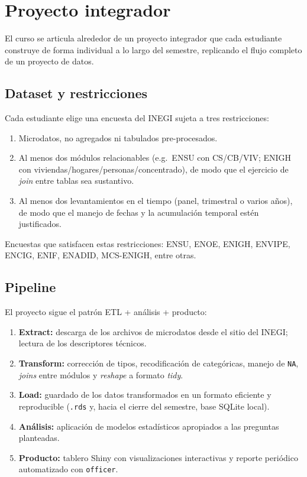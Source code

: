 \documentclass[11pt,letterpaper]{article}
\begin{document}
\section{Proyecto integrador}

El curso se articula alrededor de un proyecto integrador que cada estudiante construye de forma individual a lo largo del semestre, replicando el flujo completo de un proyecto de datos.

\subsection*{Dataset y restricciones}

Cada estudiante elige una encuesta del INEGI sujeta a tres restricciones:

\begin{enumerate}[leftmargin=*, itemsep=1pt]
    \item Microdatos, no agregados ni tabulados pre-procesados.
    \item Al menos dos módulos relacionables (e.g.\ ENSU con CS/CB/VIV; ENIGH con viviendas/hogares/personas/concentrado), de modo que el ejercicio de \textit{join} entre tablas sea sustantivo.
    \item Al menos dos levantamientos en el tiempo (panel, trimestral o varios años), de modo que el manejo de fechas y la acumulación temporal estén justificados.
\end{enumerate}

Encuestas que satisfacen estas restricciones: ENSU, ENOE, ENIGH, ENVIPE, ENCIG, ENIF, ENADID, MCS-ENIGH, entre otras.

\subsection*{Pipeline}

El proyecto sigue el patrón ETL + análisis + producto:

\begin{enumerate}[leftmargin=*, itemsep=1pt]
    \item \textbf{Extract:} descarga de los archivos de microdatos desde el sitio del INEGI; lectura de los descriptores técnicos.
    \item \textbf{Transform:} corrección de tipos, recodificación de categóricas, manejo de \texttt{NA}, \textit{joins} entre módulos y \textit{reshape} a formato \textit{tidy}.
    \item \textbf{Load:} guardado de los datos transformados en un formato eficiente y reproducible (\texttt{.rds} y, hacia el cierre del semestre, base SQLite local).
    \item \textbf{Análisis:} aplicación de modelos estadísticos apropiados a las preguntas planteadas.
    \item \textbf{Producto:} tablero Shiny con visualizaciones interactivas y reporte periódico automatizado con \texttt{officer}.
\end{enumerate}
\end{document}
